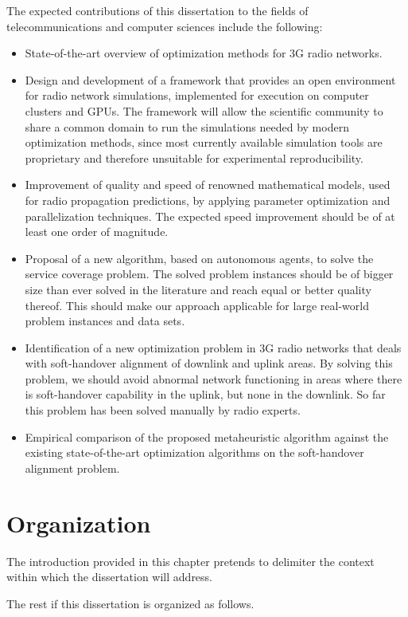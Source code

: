 The expected contributions of this dissertation to the fields of telecommunications
and computer sciences include the following:
\begin{itemize}
\item State-of-the-art overview of optimization methods for 3G radio networks.
\item Design and development of a framework that provides an open environment
for radio network simulations, implemented for execution on computer
clusters and GPUs. The framework will allow the scientific community
to share a common domain to run the simulations needed by modern optimization
methods, since most currently available simulation tools are proprietary
and therefore unsuitable for experimental reproducibility.
\item Improvement of quality and speed of renowned mathematical models,
used for radio propagation predictions, by applying parameter optimization
and parallelization techniques. The expected speed improvement should
be of at least one order of magnitude.
\item Proposal of a new algorithm, based on autonomous agents, to solve
the service coverage problem. The solved problem instances should
be of bigger size than ever solved in the literature and reach equal
or better quality thereof. This should make our approach applicable
for large real-world problem instances and data sets.
\item Identification of a new optimization problem in 3G radio networks
that deals with soft-handover alignment of downlink and uplink areas.
By solving this problem, we should avoid abnormal network functioning
in areas where there is soft-handover capability in the uplink, but
none in the downlink. So far this problem has been solved manually
by radio experts.
\item Empirical comparison of the proposed metaheuristic algorithm against
the existing state-of-the-art optimization algorithms on the soft-handover
alignment problem.
\end{itemize}

\section{Organization}

The introduction provided in this chapter pretends to delimiter the
context within which the dissertation will address.

The rest if this dissertation is organized as follows.

